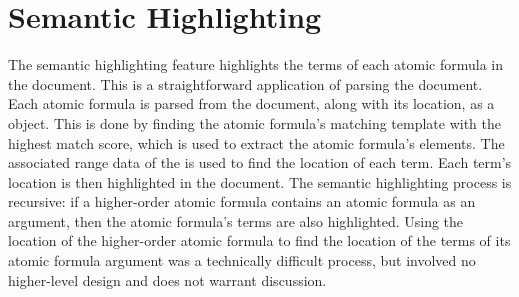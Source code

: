 \documentclass[../main.tex]{subfiles}
\begin{document}
\section{Semantic Highlighting}
The semantic highlighting feature highlights the terms of each atomic formula in the document. This is a straightforward application of parsing the document. Each atomic formula is parsed from the document, along with its location, as a  object. This is done by finding the atomic formula's matching template with the highest match score, which is used to extract the atomic formula's elements. The associated range data of the  is used to find the location of each term. Each term's location is then highlighted in the document. The semantic highlighting process is recursive: if a higher-order atomic formula contains an atomic formula as an argument, then the atomic formula's terms are also highlighted. Using the location of the higher-order atomic formula to find the location of the terms of its atomic formula argument was a technically difficult process, but involved no higher-level design and does not warrant discussion.


\end{document}
